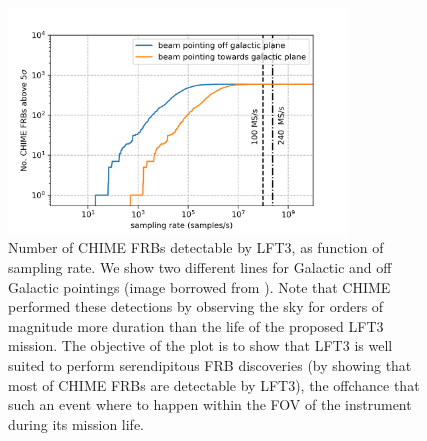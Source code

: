 \begin{figure}[h]
    \centering
    \includegraphics[width=0.8\textwidth]{figures/FRBdetections.png}
    \caption{Number of CHIME FRBs detectable by LFT3, as function of sampling rate. We show two different lines for Galactic and off Galactic pointings (image borrowed from \citealt{prabu2025lft3}).  Note that CHIME performed these detections by observing the sky for orders of magnitude more duration than the life of the proposed LFT3 mission. The objective of the plot is to show that LFT3 is well suited to perform serendipitous FRB discoveries (by showing that most of CHIME FRBs are detectable by LFT3), the offchance that such an event where to happen within the FOV of the instrument during its mission life.}
    \label{fig:FRBdetectability}
\end{figure}




